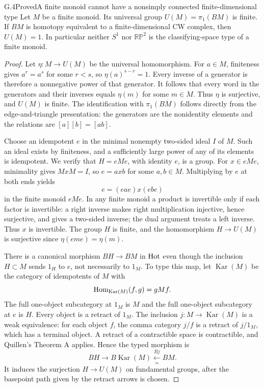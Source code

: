 \begin{claim}{G.4}{Proved}{A finite monoid cannot have a nonsimply connected finite-dimensional type}
Let $M$ be a finite monoid. Its universal group $U(M)=\pi_1(BM)$ is finite. If $BM$ is homotopy equivalent to a finite-dimensional CW complex, then $U(M)=1$. In particular neither $S^1$ nor $\mathbb{RP}^2$ is the classifying-space type of a finite monoid.
\end{claim}
\begin{proof}
Let $\eta:M\to U(M)$ be the universal homomorphism. For $a\in M$, finiteness gives $a^r=a^s$ for some $r<s$, so $\eta(a)^{s-r}=1$. Every inverse of a generator is therefore a nonnegative power of that generator. It follows that every word in the generators and their inverses equals $\eta(m)$ for some $m\in M$. Thus $\eta$ is surjective, and $U(M)$ is finite. The identification with $\pi_1(BM)$ follows directly from the edge-and-triangle presentation: the generators are the nonidentity elements and the relations are $[a][b]=[ab]$.

Choose an idempotent $e$ in the minimal nonempty two-sided ideal $I$ of $M$. Such an ideal exists by finiteness, and a sufficiently large power of any of its elements is idempotent. We verify that $H=eMe$, with identity $e$, is a group. For $x\in eMe$, minimality gives $MxM=I$, so $e=axb$ for some $a,b\in M$. Multiplying by $e$ at both ends yields
\[
                    e=(eae)x(ebe)
\]
in the finite monoid $eMe$. In any finite monoid a product is invertible only if each factor is invertible: a right inverse makes right multiplication injective, hence surjective, and gives a two-sided inverse; the dual argument treats a left inverse. Thus $x$ is invertible. The group $H$ is finite, and the homomorphism $H\to U(M)$ is surjective since $\eta(eme)=\eta(m)$.

There is a canonical morphism $BH\to BM$ in $\mathrm{Hot}$ even though the inclusion $H\subset M$ sends $1_H$ to $e$, not necessarily to $1_M$. To type this map, let $\operatorname{Kar}(M)$ be the category of idempotents of $M$ with
\[
       \operatorname{Hom}_{\operatorname{Kar}(M)}(f,g)=gMf.
\]
The full one-object subcategory at $1_M$ is $M$ and the full one-object subcategory at $e$ is $H$. Every object is a retract of $1_M$. The inclusion $j:M\to\operatorname{Kar}(M)$ is a weak equivalence: for each object $f$, the comma category $j/f$ is a retract of $j/1_M$, which has a terminal object. A retract of a contractible space is contractible, and Quillen's Theorem A applies. Hence the typed morphism is
\[
          BH\longrightarrow B\operatorname{Kar}(M)
                     \xleftarrow[\simeq]{Bj} BM.
\]
It induces the surjection $H\to U(M)$ on fundamental groups, after the basepoint path given by the retract arrows is chosen.


\end{proof}
